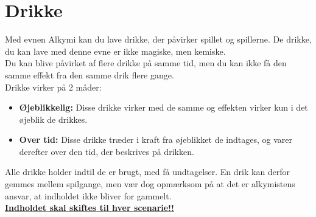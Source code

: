 \chapter{Drikke}

Med evnen Alkymi kan du lave drikke, der påvirker spillet og spillerne. De drikke, du kan lave med denne evne er ikke magiske, men kemiske.\\
Du kan blive påvirket af flere drikke på samme tid, men du kan ikke få den samme effekt fra den samme drik flere gange.\\
Drikke virker på 2 måder:
\begin{itemize}
    \item \textbf{Øjeblikkelig:} Disse drikke virker med de samme og effekten virker kun i det øjeblik de drikkes.
    \item \textbf{Over tid:} Disse drikke træder i kraft fra øjeblikket de indtages, og varer derefter over den tid, der beskrives på drikken.
\end{itemize}

Alle drikke holder indtil de er brugt, med få undtagelser. En drik kan derfor gemmes mellem spilgange, men vær dog opmærksom på at det er alkymistens ansvar, at indholdet ikke bliver for gammelt.\\
\textbf{\underline{Indholdet skal skiftes til hver scenarie!!}}

